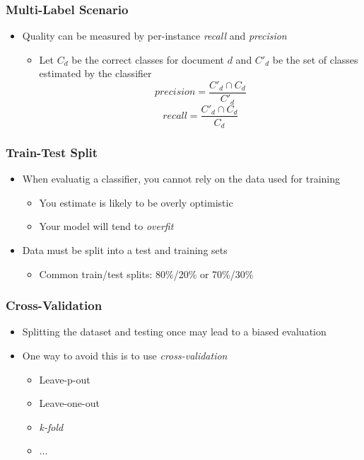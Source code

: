 \documentclass[svgnames]{beamer}
\begin{document}

\begin{frame} \frametitle{Multi-Label Scenario }
  
  \begin{itemize}
  \item Quality can be measured by per-instance \emph{recall} and \emph{precision}
    \begin{itemize}
    \item Let $C_d$ be the correct classes for document $d$ and $C'_d$ be the
      set of classes estimated by the classifier
      \begin{displaymath}
        precision = \frac{C'_d \cap C_d}{C'_d}
      \end{displaymath}
      \begin{displaymath}
        recall = \frac{C'_d \cap C_d}{C_d}
      \end{displaymath}
    \end{itemize}
  \end{itemize}
\end{frame}


\begin{frame}
    \frametitle{Train-Test Split}
    \begin{itemize}
    \item When evaluatig a classifier, you cannot rely on the data used for
        training
        \begin{itemize}
        \item You estimate is likely to be overly optimistic
        \item Your model will tend to \emph{overfit}
        \end{itemize}
    \item Data must be split into a test and training sets
        \begin{itemize}
        \item Common train/test splits: 80\%/20\% or 70\%/30\%
        \end{itemize}
    \end{itemize}
\end{frame}

\begin{frame}
    \frametitle{Cross-Validation}
    \begin{itemize}
    \item Splitting the dataset and testing once may lead to a biased
        evaluation
    \item One way to avoid this is to use \emph{cross-validation}
        \begin{itemize}
        \item Leave-p-out
        \item Leave-one-out
        \item \emph{k-fold}
        \item ...
        \end{itemize}
    \end{itemize}
\end{frame}
\end{document}
